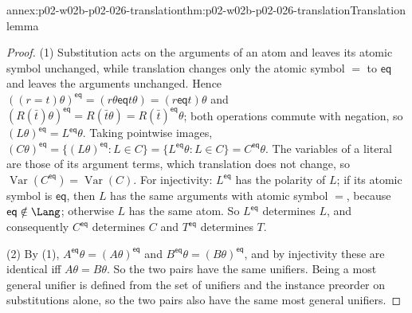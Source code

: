 \begin{annexitem}{annex:p02-w02b-p02-026-translation}{thm:p02-w02b-p02-026-translation}{Translation lemma}
\begin{proof}
(1)  Substitution acts on the arguments of an atom and leaves its atomic
symbol unchanged, while translation changes only the atomic symbol \(=\) to
\(\mathsf{eq}\) and leaves the arguments unchanged.  Hence
\(((r=t)\theta)^{\mathsf{eq}}=(r\theta\mathrel{\mathsf{eq}}t\theta)
=(r\mathrel{\mathsf{eq}}t)\theta\) and
\((R(\bar t)\theta)^{\mathsf{eq}}=R(\bar t\theta)=R(\bar t)^{\mathsf{eq}}\theta\);
both operations commute with negation, so
\((L\theta)^{\mathsf{eq}}=L^{\mathsf{eq}}\theta\).  Taking pointwise images,
\((C\theta)^{\mathsf{eq}}=\{(L\theta)^{\mathsf{eq}}:L\in C\}
=\{L^{\mathsf{eq}}\theta:L\in C\}=C^{\mathsf{eq}}\theta\).  The variables of a
literal are those of its argument terms, which translation does not change,
so \(\operatorname{Var}(C^{\mathsf{eq}})=\operatorname{Var}(C)\).  For
injectivity: \(L^{\mathsf{eq}}\) has the polarity of \(L\); if its atomic
symbol is \(\mathsf{eq}\), then \(L\) has the same arguments with atomic
symbol \(=\), because \(\mathsf{eq}\notin\Lang\); otherwise \(L\) has the same
atom.  So \(L^{\mathsf{eq}}\) determines \(L\), and consequently
\(C^{\mathsf{eq}}\) determines \(C\) and \(T^{\mathsf{eq}}\) determines
\(T\).

(2)  By (1), \(A^{\mathsf{eq}}\theta=(A\theta)^{\mathsf{eq}}\) and
\(B^{\mathsf{eq}}\theta=(B\theta)^{\mathsf{eq}}\), and by injectivity these are
identical iff \(A\theta=B\theta\).  So the two pairs have the same unifiers.
Being a most general unifier is defined from the set of unifiers and the
instance preorder on substitutions alone, so the two pairs also have the same
most general unifiers.


\end{proof}
\end{annexitem}
